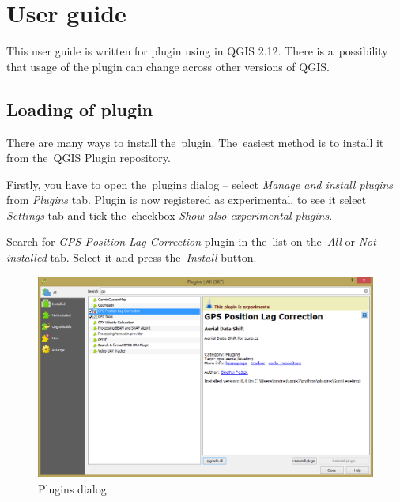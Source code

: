 
\chapter{User guide}
\label{user-guide}

This user guide is written for plugin using in QGIS 2.12. There is a~possibility that usage of the plugin
can change across other versions of QGIS. 

\section{Loading of plugin}
\label{plugin-load}

There are many ways to install the~plugin.
The~easiest method is to install it from
the~QGIS Plugin repository. 

Firstly, you have to open the~plugins dialog – select
\textit{Manage and install plugins} from
\textit{Plugins} tab. Plugin is now registered as
experimental, to see it select \textit{Settings}
tab and tick the~checkbox \textit{Show also experimental plugins}. 


Search for \textit{GPS Position Lag Correction} plugin in
the~list on the~\textit{All} or \textit{Not installed} tab.
Select it and press the~\textit{Install} button. 

  \begin{figure}[H]
   \centering
	\includegraphics[scale=0.52]{./pictures/plugin-dialog.png}
	\caption[GUI]{Plugins dialog}
      \label{fig:plugins-dialog}
  \end{figure}

